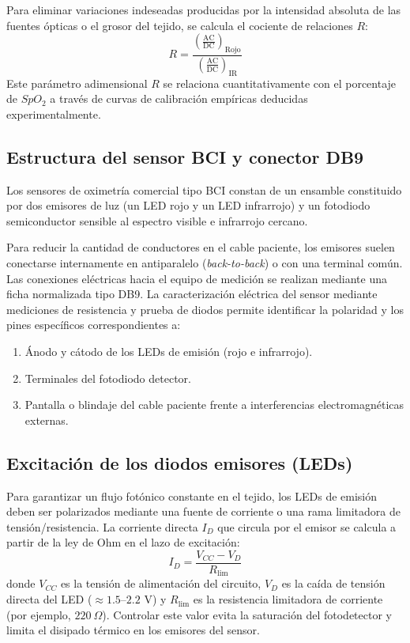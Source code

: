 Para eliminar variaciones indeseadas producidas por la intensidad absoluta de las fuentes ópticas o el grosor del tejido, se calcula el cociente de relaciones $R$:
\begin{equation}
    R = \frac{\left( \frac{\text{AC}}{\text{DC}} \right)_{\text{Rojo}}}{\left( \frac{\text{AC}}{\text{DC}} \right)_{\text{IR}}}
\end{equation}
Este parámetro adimensional $R$ se relaciona cuantitativamente con el porcentaje de $SpO_2$ a través de curvas de calibración empíricas deducidas experimentalmente.

\subsection{Estructura del sensor BCI y conector DB9}
Los sensores de oximetría comercial tipo BCI constan de un ensamble constituido por dos emisores de luz (un LED rojo y un LED infrarrojo) y un fotodiodo semiconductor sensible al espectro visible e infrarrojo cercano. 

Para reducir la cantidad de conductores en el cable paciente, los emisores suelen conectarse internamente en antiparalelo (\textit{back-to-back}) o con una terminal común. Las conexiones eléctricas hacia el equipo de medición se realizan mediante una ficha normalizada tipo DB9. La caracterización eléctrica del sensor mediante mediciones de resistencia y prueba de diodos permite identificar la polaridad y los pines específicos correspondientes a:
\begin{enumerate}
    \item Ánodo y cátodo de los LEDs de emisión (rojo e infrarrojo).
    \item Terminales del fotodiodo detector.
    \item Pantalla o blindaje del cable paciente frente a interferencias electromagnéticas externas.
\end{enumerate}


\subsection{Excitación de los diodos emisores (LEDs)}
Para garantizar un flujo fotónico constante en el tejido, los LEDs de emisión deben ser polarizados mediante una fuente de corriente o una rama limitadora de tensión/resistencia. La corriente directa $I_D$ que circula por el emisor se calcula a partir de la ley de Ohm en el lazo de excitación:
\begin{equation}
    I_D = \frac{V_{CC} - V_D}{R_{\text{lim}}}
\end{equation}
donde $V_{CC}$ es la tensión de alimentación del circuito, $V_D$ es la caída de tensión directa del LED ($\approx 1.5\text{--}2.2\text{ V}$) y $R_{\text{lim}}$ es la resistencia limitadora de corriente (por ejemplo, $220\ \Omega$). Controlar este valor evita la saturación del fotodetector y limita el disipado térmico en los emisores del sensor.